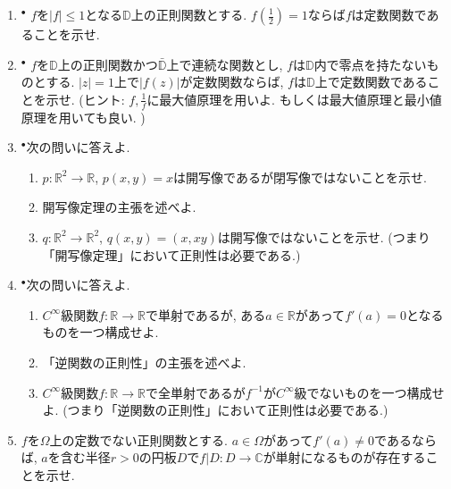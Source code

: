 \documentclass[dvipdfmx,a4paper,11pt]{article}
\newcommand{\R}{\mathbb{R}}
\newcommand{\C}{\mathbb{C}}
\newcommand{\D}{\mathbb{D}}
\theoremstyle{definition}
\begin{document}
\begin{enumerate}[label=\textbf{問}6.\arabic*]

\item $^{\bullet}$ $f$を$|f| \le 1$となる$\D$上の正則関数とする. $f(\frac{1}{2})=1$ならば$f$は定数関数であることを示せ.

\item $^{\bullet}$ $f$を$\D$上の正則関数かつ$\bar{\D}$上で連続な関数とし, $f$は$\D$内で零点を持たないものとする. 
$|z|=1$上で$|f(z)|$が定数関数ならば, $f$は$\D$上で定数関数であることを示せ. (ヒント: $f, \frac{1}{f}$に最大値原理を用いよ. もしくは最大値原理と最小値原理を用いても良い. )

\item $^{\bullet}$次の問いに答えよ.
  \begin{enumerate}
\setlength{\parskip}{0cm} 
  \setlength{\itemsep}{0cm} 
\item  $p : \R^{2} \rightarrow \R$, $p(x,y)=x$は開写像であるが閉写像ではないことを示せ. 
\item 開写像定理の主張を述べよ.
\item $q : \R^{2} \rightarrow \R^2$, $q(x,y)=(x,xy)$は開写像ではないことを示せ.  (つまり「開写像定理」において正則性は必要である.)
    \end{enumerate}  
   

\item $^{\bullet}$次の問いに答えよ.
  \begin{enumerate}
\setlength{\parskip}{0cm} 
  \setlength{\itemsep}{0cm} 
  \item $C^{\infty}$級関数$f : \R \rightarrow \R$で単射であるが, ある$a \in \R$があって$f'(a)=0$となるものを一つ構成せよ.
   \item 「逆関数の正則性」の主張を述べよ.
\item $C^\infty$級関数$f : \R \rightarrow \R$で全単射であるが$f^{-1}$が$C^{\infty}$級でないものを一つ構成せよ. (つまり「逆関数の正則性」において正則性は必要である.)
   \end{enumerate}  
   
   
   \item $f$を$\Omega$上の定数でない正則関数とする. $a \in \Omega$があって$f' (a) \neq 0$であるならば, 
   $a$を含む半径$r > 0$の円板$D$で$f|D : D \rightarrow \C$が単射になるものが存在することを示せ.
    

\end{enumerate}
\end{document}
